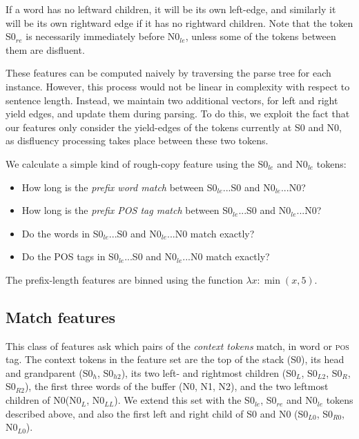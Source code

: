 \documentclass[11pt,letterpaper]{article}
\newcommand{\pos}{\textsc{pos}\xspace}
\newcommand{\szero}{S0\xspace}
\newcommand{\nzero}{N0\xspace}
\newcommand{\szeroH}{S0$_h$\xspace}
\newcommand{\szeroHH}{S0$_{h2}$\xspace}
\newcommand{\szeroL}{S0$_L$\xspace}
\newcommand{\szeroLL}{S0$_{L2}$\xspace}
\newcommand{\szeroR}{S0$_R$\xspace}
\newcommand{\szeroRR}{S0$_{R2}$\xspace}
\newcommand{\szeroLzero}{S0$_{L0}$\xspace}
\newcommand{\szeroRzero}{S0$_{R0}$\xspace}
\newcommand{\nzeroL}{N0$_L$\xspace}
\newcommand{\nzeroLL}{N0$_{LL}$\xspace}
\newcommand{\nzeroLzero}{N0$_{L0}$\xspace}
\newcommand{\szeroRedge}{S0$_{re}$\xspace}
\newcommand{\szeroLedge}{S0$_{le}$\xspace}
\newcommand{\nzeroLedge}{N0$_{le}$\xspace}
\begin{document}
If a word has
no leftward children, it will be its own left-edge, and similarly it will be
its own rightward edge if it has no rightward children. Note that the token
\szeroRedge is necessarily immediately before \nzeroLedge, unless some of the
tokens between them are disfluent.

These features can be computed naively by traversing the parse tree for each
instance. However, this process would not be linear in complexity with respect
to sentence length.  Instead, we maintain two additional vectors, for left
and right yield edges, and update them during parsing.  To do this, we exploit
the fact that our features only consider the yield-edges of the tokens currently
at S0 and N0, as disfluency processing takes place between these two tokens.

We calculate a simple kind of rough-copy feature using the \szeroLedge and
\nzeroLedge tokens:

\begin{itemize}
    \itemsep0em
    \item How long is the \emph{prefix word match} between \szeroLedge...\szero
          and \nzeroLedge...\nzero?
    \item How long is the \emph{prefix POS tag match} between \szeroLedge...\szero
          and \nzeroLedge...\nzero?
    \item Do the words in \szeroLedge...\szero and \nzeroLedge...\nzero match
          exactly?
    \item Do the POS tags in \szeroLedge...\szero and \nzeroLedge...\nzero match
          exactly?
\end{itemize}

The prefix-length features are binned using the function $\lambda x: \min(x, 5)$.

\subsection{Match features}

This class of features ask which pairs of the \emph{context tokens} match, in
word or \pos tag.  The context tokens in the \citet{zhang:11} feature set
are the top of the stack (\szero), its head and grandparent (\szeroH, \szeroHH),
its two left- and rightmost children (\szeroL, \szeroLL, \szeroR, \szeroRR), the
first three words of the buffer (\nzero, N1, N2), and the two leftmost children
of \nzero (\nzeroL, \nzeroLL).
We extend this set with the \szeroLedge, \szeroRedge and \nzeroLedge tokens
described above, and also the first left and right child of \szero and \nzero
(\szeroLzero, \szeroRzero, \nzeroLzero).
\end{document}
